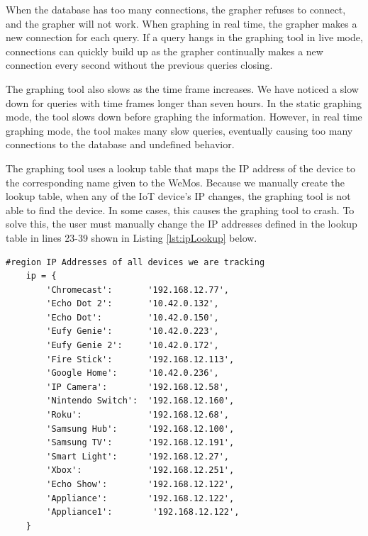 When the database has too many connections, the grapher refuses to connect, and the grapher will not work. When graphing in real time, the grapher makes a new connection for each query. If a query hangs in the graphing tool in live mode, connections can quickly build up as the grapher continually makes a new connection every second without the previous queries closing.

The graphing tool also slows as the time frame increases. We have noticed a slow down for queries with time frames longer than seven hours. In the static graphing mode, the tool slows down before graphing the information. However, in real time graphing mode, the tool makes many slow queries, eventually causing too many connections to the database and undefined behavior.

The graphing tool uses a lookup table that maps the IP address of the device to the corresponding name given to the WeMos. Because we manually create the lookup table, when any of the IoT device's IP changes, the graphing tool is not able to find the device. In some cases, this causes the graphing tool to crash. To solve this, the user must manually change the IP addresses defined in the lookup table in lines 23-39 shown in Listing \ref{lst:ipLookup} below.

\begin{minipage}{\textwidth}
    \begin{lstlisting}[label={lst:ipLookup},caption={IP lookup table in real time IoT grapher.}]
    #region IP Addresses of all devices we are tracking
    ip = {
        'Chromecast':       '192.168.12.77',
        'Echo Dot 2':       '10.42.0.132',
        'Echo Dot':         '10.42.0.150',
        'Eufy Genie':       '10.42.0.223',
        'Eufy Genie 2':     '10.42.0.172',
        'Fire Stick':       '192.168.12.113',
        'Google Home':      '10.42.0.236',
        'IP Camera':        '192.168.12.58',
        'Nintendo Switch':  '192.168.12.160',
        'Roku':             '192.168.12.68',
        'Samsung Hub':      '192.168.12.100',
        'Samsung TV':       '192.168.12.191',
        'Smart Light':      '192.168.12.27',
        'Xbox':             '192.168.12.251',
        'Echo Show':        '192.168.12.122',
        'Appliance':        '192.168.12.122',
        'Appliance1':        '192.168.12.122',
    }
    \end{lstlisting}
\end{minipage}
